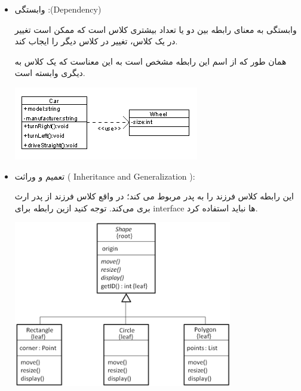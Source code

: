 \documentclass[]{article}
\begin{document}
\begin{itemize}[label=\textcolor{listColor}{$\blacklozenge$}]
\begin{center}
\end{center}
\newpage
\begin{itemize}[label=\textcolor{umlrelcolor}{$\blacksquare$}]
 \item
   {\fehrest \textcolor{umlrelcolor}{وابستگی :(Dependency)
 }}
 

 
 وابستگی به معنای رابطه بین دو یا تعداد بیشتری کلاس است که ممکن است تغییر در یک کلاس، تغییر در کلاس دیگر را ایجاب کند.
 
همان طور که از اسم این رابطه مشخص است به این معناست که یک کلاس به دیگری وابسته است.


   \begin{center}

\includegraphics[]{images/image3.png}

\end{center}


 \item
   {\fehrest \textcolor{umlrelcolor}{تعمیم و وراثت ( Inheritance and Generalization ):
 }}
 

 
 این رابطه کلاس فرزند را به پدر مربوط می کند؛ در واقع کلاس فرزند از پدر ارث بری می‌کند.
توجه کنید ازین رابطه برای interface  ها نباید استفاده کرد.


   \begin{center}

\includegraphics[width=0.75\textwidth]{images/image10.png}


\end{center}
\end{itemize}
\end{itemize}
\end{document}
